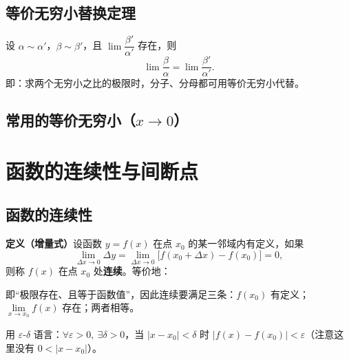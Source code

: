 \subsection{等价无穷小替换定理}
设 $\alpha\sim\alpha'$，$\beta\sim\beta'$，且 $\lim\dfrac{\beta'}{\alpha'}$ 存在，则
\[
\lim\frac{\beta}{\alpha}=\lim\frac{\beta'}{\alpha'} .
\]
即：求两个无穷小之比的极限时，分子、分母都可用等价无穷小代替。

\subsection{常用的等价无穷小（$x\to0$）}


\section{函数的连续性与间断点}

\subsection{函数的连续性}
\textbf{定义（增量式）}\quad 设函数 $y=f(x)$ 在点 $x_0$ 的某一邻域内有定义，如果
\[
\lim_{\Delta x\to0}\Delta y=\lim_{\Delta x\to0}\bigl[f(x_0+\Delta x)-f(x_0)\bigr]=0,
\]
则称 $f(x)$ 在点 $x_0$ 处\textbf{连续}。等价地：


\noindent 即“极限存在、且等于函数值”，因此连续要满足三条：$f(x_0)$ 有定义；$\lim\limits_{x\to x_0}f(x)$ 存在；两者相等。

用 $\varepsilon$-$\delta$ 语言：$\forall\varepsilon>0,\ \exists\delta>0$，当 $|x-x_0|<\delta$ 时 $|f(x)-f(x_0)|<\varepsilon$（注意这里没有 $0<|x-x_0|$）。


